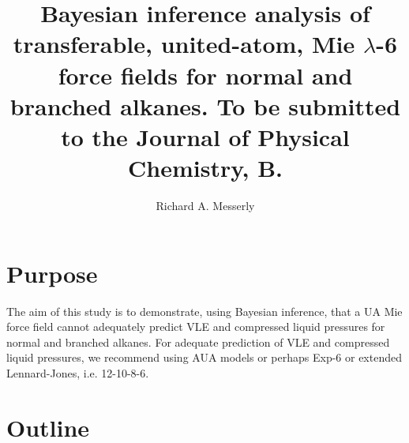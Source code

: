 \documentclass[preprint,letterpaper,floatfix,citeautoscript,aip,jcp]{revtex4-1}
\begin{document}
\title{Bayesian inference analysis of transferable, united-atom, Mie $\lambda$-6 force fields for normal and branched alkanes. To be submitted to the Journal of Physical Chemistry, B.}

\author{Richard A. Messerly}


\begin{abstract}

\end{abstract}

\maketitle

\section*{Purpose}

The aim of this study is to demonstrate, using Bayesian inference, that a UA Mie force field cannot adequately predict VLE and compressed liquid pressures for normal and branched alkanes. For adequate prediction of VLE and compressed liquid pressures, we recommend using AUA models or perhaps Exp-6 or extended Lennard-Jones, i.e. 12-10-8-6. %

\section*{Outline}

\end{document}

